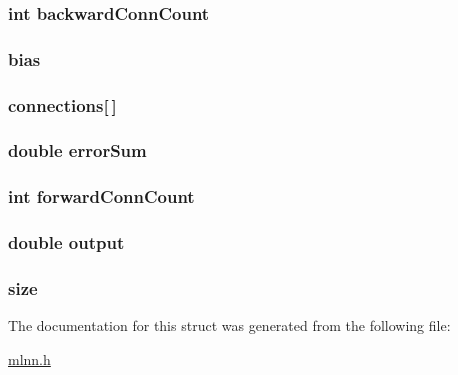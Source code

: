\subsubsection[{backward\+Conn\+Count}]{\setlength{\rightskip}{0pt plus 5cm}int backward\+Conn\+Count}\label{struct_node_a869b3dfcdb29befb43ba4fd88cfb4ff8}
\hypertarget{struct_node_ad44b9b54f0b17c39aed411e4fd53bd65}{}
\subsubsection[{bias}]{ bias}\label{struct_node_ad44b9b54f0b17c39aed411e4fd53bd65}
\hypertarget{struct_node_a97eb8879b8aa05ba1d09440be3ba1f96}{}
\subsubsection[{connections}]{ connections\mbox{[}$\,$\mbox{]}}\label{struct_node_a97eb8879b8aa05ba1d09440be3ba1f96}
\hypertarget{struct_node_a0ffb8762677eef2369816a899636b44f}{}
\subsubsection[{error\+Sum}]{\setlength{\rightskip}{0pt plus 5cm}double error\+Sum}\label{struct_node_a0ffb8762677eef2369816a899636b44f}
\hypertarget{struct_node_a498c0b6b6fb05b96b32c23d8fa021cf3}{}
\subsubsection[{forward\+Conn\+Count}]{\setlength{\rightskip}{0pt plus 5cm}int forward\+Conn\+Count}\label{struct_node_a498c0b6b6fb05b96b32c23d8fa021cf3}
\hypertarget{struct_node_a47943f73244ca117fa9bf9234cbed317}{}
\subsubsection[{output}]{\setlength{\rightskip}{0pt plus 5cm}double output}\label{struct_node_a47943f73244ca117fa9bf9234cbed317}
\hypertarget{struct_node_aab34baa6cb3e7bebfb7f4ba88a0ffbda}{}
\subsubsection[{size}]{ size}\label{struct_node_aab34baa6cb3e7bebfb7f4ba88a0ffbda}


The documentation for this struct was generated from the following file\+:\begin{DoxyCompactItemize}
\item 
\hyperlink{mlnn_8h}{mlnn.\+h}\end{DoxyCompactItemize}
